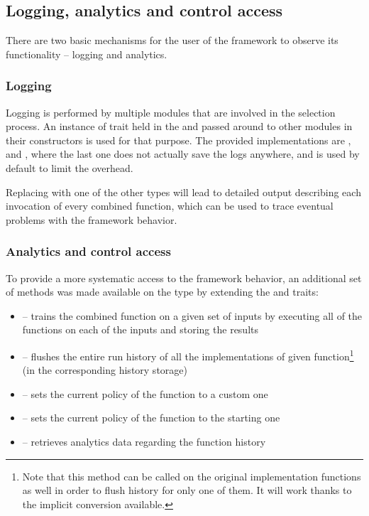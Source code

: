 \subsection{Logging, analytics and control access}

There are two basic mechanisms for the user of the framework to observe its functionality -- logging and analytics.

\subsubsection{Logging}

Logging is performed by multiple modules that are involved in the selection process. An instance of  trait held in the  and passed around to other modules in their constructors is used for that purpose. The provided implementations are ,  and , where the last one does not actually save the logs anywhere, and is used by default to limit the overhead.

Replacing  with one of the other types will lead to detailed output describing each invocation of every combined function, which can be used to trace eventual problems with the framework behavior.

\subsubsection{Analytics and control access}
\label{subsubsec:analytics}

To provide a more systematic access to the framework behavior, an additional set of methods was made available on the  type by extending the  and  traits:

\begin{itemize}
	\item {} -- trains the combined function on a given set of inputs by executing all of the functions on each of the inputs and storing the results
	\item {} -- flushes the entire run history of all the implementations of given function\footnote{Note that this method can be called on the original implementation functions  as well in order to flush history for only one of them. It will work thanks to the implicit conversion available.} (in the corresponding history storage)
	\item {} -- sets the current policy of the function to a custom one
	\item {} -- sets the current policy of the function to the starting one
	\item {} -- retrieves analytics data regarding the function history
\end{itemize}

